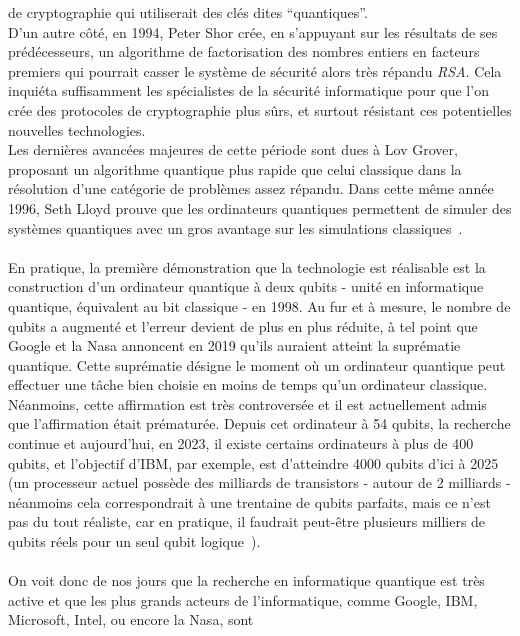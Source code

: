 de cryptographie qui utiliserait des clés dites ``quantiques''.\\
D'un autre côté, en 1994, Peter Shor crée, en s'appuyant sur les résultats de ses prédécesseurs, un algorithme
de factorisation des nombres entiers en facteurs premiers qui pourrait casser le système de sécurité alors très répandu
\textit{RSA}.
Cela inquiéta suffisamment les spécialistes de la sécurité informatique pour que l'on crée des protocoles
de cryptographie plus sûrs, et surtout résistant ces potentielles nouvelles technologies.\\
Les dernières avancées majeures de cette période sont dues à Lov Grover, proposant un algorithme
quantique plus rapide que celui classique dans la résolution d'une catégorie de problèmes assez répandu.
Dans cette même année 1996, Seth Lloyd prouve que les ordinateurs quantiques permettent de simuler
des systèmes quantiques avec un gros avantage sur les simulations classiques~\cite{wiki:hisotry-qc}.\\ \\
En pratique, la première démonstration que la technologie est réalisable est la construction d'un ordinateur
quantique à deux qubits - unité en informatique quantique, équivalent au bit classique - en 1998.
Au fur et à mesure, le nombre de qubits a augmenté et l'erreur devient de plus en plus réduite, à tel
point que Google et la Nasa annoncent en 2019 qu'ils auraient atteint la suprématie quantique.
Cette suprématie désigne le moment où un ordinateur quantique peut effectuer une tâche bien choisie en moins de temps
qu'un ordinateur classique.\\
Néanmoins, cette affirmation est très controversée et il est actuellement admis que l'affirmation
était prématurée.
Depuis cet ordinateur à 54 qubits, la recherche continue et aujourd'hui, en 2023, il existe certains
ordinateurs à plus de 400 qubits, et l'objectif d'IBM, par exemple, est d'atteindre 4000 qubits d'ici
à 2025~\cite{ibm-plans} (un processeur actuel possède des milliards de transistors - autour de 2 milliards - néanmoins
cela correspondrait à une trentaine de qubits parfaits, mais ce n'est pas du tout réaliste, car en
pratique, il faudrait peut-être plusieurs milliers de qubits réels pour un seul qubit logique~\cite{qubit-error-correction,qubit-logique}).\\ \\
On voit donc de nos jours que la recherche en informatique quantique est très active et que les
plus grands acteurs de l'informatique, comme Google, IBM, Microsoft, Intel, ou encore la Nasa, sont

